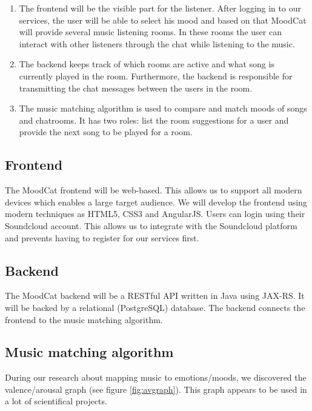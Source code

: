 \documentclass[10pt,a4paper]{article}
\begin{document}
\begin{enumerate}
\item The frontend will be the visible part for the listener.
After logging in to our services, the user will be able to select his mood and based on that MoodCat will provide several music listening rooms.
In these rooms the user can interact with other listeners through the chat while listening to the music.

\item The backend keeps track of which rooms are active and what song is currently played in the room.
Furthermore, the backend is responsible for transmitting the chat messages between the users in the room.

\item The music matching algorithm is used to compare and match moods of songs and chatrooms.
It has two roles: list the room suggestions for a user and provide the next song to be played for a room.
\end{enumerate}

\newpage

\subsection{Frontend}

The MoodCat frontend will be web-based. This allows us to support all modern devices which enables a large target audience. We will develop the frontend using modern techniques as HTML5, CSS3 and AngularJS. Users can login using their Soundcloud account. This allows us to integrate with the Soundcloud platform and prevents having to register for our services first.

\subsection{Backend}

The MoodCat backend will be a RESTful API written in Java using JAX-RS. It will be backed by a relational (PostgreSQL) database. The backend connects the frontend to the music matching algorithm.

\subsection{Music matching algorithm}

During our research about mapping music to emotions/moods, we discovered the valence/arousal graph (see figure \ref{fig:avgraph}).
This graph appears to be used in a lot of scientifical projects.
\end{document}
